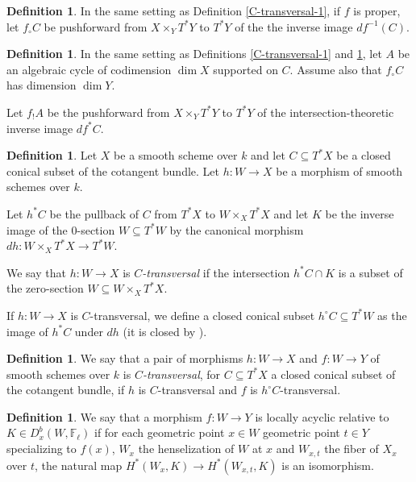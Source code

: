 \documentclass[12pt]{amsart}
\theoremstyle{definition}
\newtheorem{definition}[theorem]{Definition}
\theoremstyle{remark}
\begin{document}
\begin{definition}\cite[(1.2)]{Beilinson}\label{circ-forward} In the same setting as Definition \ref{C-transversal-1}, if $f$ is proper, let $f_\circ C$ be pushforward from $X \times_Y T^* Y$ to $T^*Y $ of the the inverse image $df^{-1}(C)$.

\end{definition}

\begin{definition}\cite[(2.3)]{saito-direct}\label{shriek-forward}  In the same setting as Definitions \ref{C-transversal-1} and \ref{circ-forward}, let $A$ be an algebraic cycle of codimension $\dim X$ supported on $C$. Assume also that $f_\circ C$ has dimension $\dim Y$.

Let $f_!  A$ be the pushforward from $X \times_Y T^* Y$ to $T^*Y $ of the intersection-theoretic inverse image $df^* C$. \end{definition} 



\begin{definition}\cite[Definition 3.1]{saito1} Let $X$ be a smooth scheme over $k$ and let $C \subseteq T^* X$ be a closed conical subset of the cotangent bundle. Let $h: W \to X$ be a morphism of smooth schemes over $k$.

Let $h^* C$ be the pullback of $C$ from $T^* X$ to $W \times_X T^* X$ and let $K$ be the inverse image of the $0$-section $W \subseteq T^* W$ by the canonical morphism $dh: W \times_X T^* X \to T^* W$. 

We say that $h: W\to X$ is \emph{$C$-transversal} if the intersection $h^* C \cap K$ is a subset of the zero-section $W \subseteq W \times_X T^* X$.

If $h: W \to X$ is $C$-transversal, we define a closed conical subset $h^\circ C \subseteq T^* W$ as the image of $h^* C$ under $dh$ (it is closed by \cite[Lemma 3.1]{saito1}). \end{definition}

\begin{definition}\cite[Definition 3.5(2)]{saito1} We say that a pair of morphisms $h: W \to X$ and $f:W\to Y$ of smooth schemes over $k$ is \emph{$C$-transversal}, for $C \subseteq T^* X$ a closed conical subset of the cotangent bundle, if $h$ is $C$-transversal and $f$ is $h^\circ C$-transversal. \end{definition}

\begin{definition}\cite[Th. Finitude, Definition 2.12]{sga4h} We say that a morphism $f: W \to Y$ is locally acyclic relative to $K \in D^b_x(W, \mathbb F_\ell)$ if for each geometric point $x \in W$ geometric point  $t \in Y$ specializing to $f(x)$, $W_x$ the henselization of $W$ at $x$ and $W_{x,t}$ the fiber of $X_x$ over $t$, the natural map $H^* ( W_x, K) \to H^* ( W_{x,t}, K)$ is an isomorphism.  \end{definition}
\end{document}
